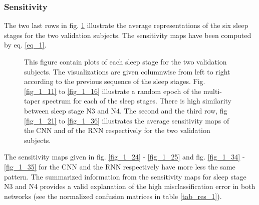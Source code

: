 %

\subsubsection{Sensitivity}

The two last rows in fig. \ref{fig_1} illustrate the average representations of the six sleep stages for the two validation subjects. The sensitivity maps have been computed by eq. \ref{eq_1}.

\begin{figure*}[th!]
\centering

\caption{This figure contain plots of each sleep stage for the two validation subjects. The visualizations are given columnwise from left to right according to the previous sequence of the sleep stages. Fig. \ref{fig_1_11} to \ref{fig_1_16} illustrate a random epoch of the multi-taper spectrum for each of the sleep stages. There is high similarity between sleep stage N3 and N4.
The second and the third row, fig \ref{fig_1_21} to \ref{fig_1_36} illustrates the average sensitivity maps of the CNN and of the RNN respectively for the two validation subjects.}
\label{fig_1}
\end{figure*}

The sensitivity maps given in fig. \ref{fig_1_24} - \ref{fig_1_25} and fig. \ref{fig_1_34} - \ref{fig_1_35} for the CNN and the RNN respectively have more less the same pattern. 
The summarized information from the sensitivity maps for sleep stage N3 and N4 provides a valid explanation of the high misclassification error in both networks (see the normalized confusion matrices in table \ref{tab_res_1}).

